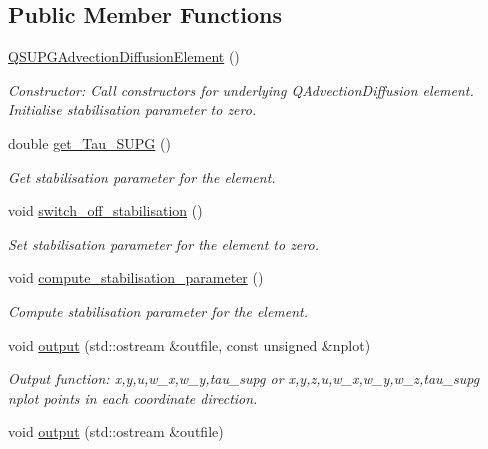 \subsection*{Public Member Functions}
\begin{DoxyCompactItemize}
\item 
\hyperlink{classoomph_1_1QSUPGAdvectionDiffusionElement_ad5b142914b89f193f32967997e42d1a2}{Q\+S\+U\+P\+G\+Advection\+Diffusion\+Element} ()
\begin{DoxyCompactList}\small\item\em Constructor\+: Call constructors for underlying Q\+Advection\+Diffusion element. Initialise stabilisation parameter to zero. \end{DoxyCompactList}\item 
double \hyperlink{classoomph_1_1QSUPGAdvectionDiffusionElement_a43b3c4aecd65d3c2f5bd710c56bf98dd}{get\+\_\+\+Tau\+\_\+\+S\+U\+PG} ()
\begin{DoxyCompactList}\small\item\em Get stabilisation parameter for the element. \end{DoxyCompactList}\item 
void \hyperlink{classoomph_1_1QSUPGAdvectionDiffusionElement_a23b79fb4702c948646eade4261a8a281}{switch\+\_\+off\+\_\+stabilisation} ()
\begin{DoxyCompactList}\small\item\em Set stabilisation parameter for the element to zero. \end{DoxyCompactList}\item 
void \hyperlink{classoomph_1_1QSUPGAdvectionDiffusionElement_a0aaae49d23075bac8fc1f2d467354dce}{compute\+\_\+stabilisation\+\_\+parameter} ()
\begin{DoxyCompactList}\small\item\em Compute stabilisation parameter for the element. \end{DoxyCompactList}\item 
void \hyperlink{classoomph_1_1QSUPGAdvectionDiffusionElement_a9055a63b9b8c9f3bf606192e52413326}{output} (std\+::ostream \&outfile, const unsigned \&nplot)
\begin{DoxyCompactList}\small\item\em Output function\+: x,y,u,w\+\_\+x,w\+\_\+y,tau\+\_\+supg or x,y,z,u,w\+\_\+x,w\+\_\+y,w\+\_\+z,tau\+\_\+supg nplot points in each coordinate direction. \end{DoxyCompactList}\item 
void \hyperlink{classoomph_1_1QSUPGAdvectionDiffusionElement_a13469ca1c2520461e62374e600ecf84d}{output} (std\+::ostream \&outfile)

\end{DoxyCompactItemize}
